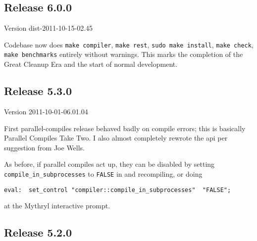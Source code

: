 \cutend*




\subsection{Release 6.0.0}
\label{section:src:release-6.0.0}

Version dist-2011-10-15-02.45 

Codebase now does {\tt make compiler}, {\tt make rest}, {\tt sudo make install}, {\tt make check}, {\tt make benchmarks} 
entirely without warnings.  This marks the completion of the Great Cleanup Era and the start of normal development. 

\cutend*



\subsection{Release 5.3.0}
\label{section:src:release-5.3.0}

Version 2011-10-01-06.01.04

First parallel-compiles release behaved badly on compile errors; 
this is basically Parallel Compiles Take Two.  I also almost 
completely rewrote the  
api per suggestion from Joe Wells. 

As before, if parallel compiles act up, they 
can be disabled by setting {\tt compile\_in\_subprocesses} to 
{\tt FALSE} in   
and recompiling, or doing 
\begin{verbatim}
eval:  set_control "compiler::compile_in_subprocesses" 	"FALSE";
\end{verbatim}
at the Mythryl interactive prompt. 

\cutend*





\subsection{Release 5.2.0}
\label{section:src:release-5.2.0}

